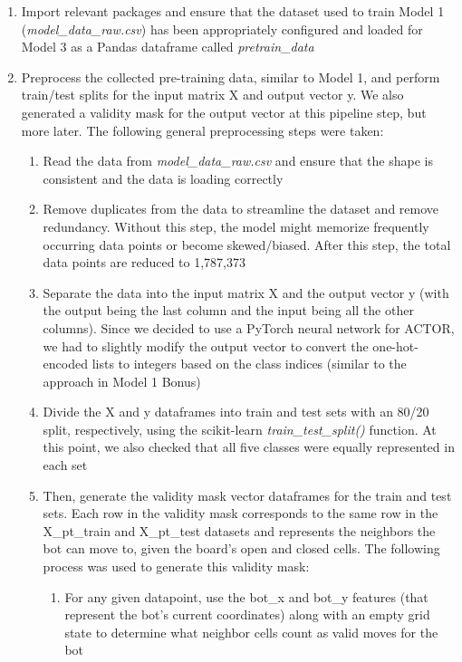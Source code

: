 \documentclass[11pt]{article}
\begin{document}
\begin{enumerate}
    \item Import relevant packages and ensure that the dataset used to train Model 1 (\emph{model\_data\_raw.csv}) has been appropriately configured and loaded for Model 3 as a Pandas dataframe called \emph{pretrain\_data}
    \item Preprocess the collected pre-training data, similar to Model 1, and perform train/test splits for the input matrix X and output vector y. We also generated a validity mask for the output vector at this pipeline step, but more later. The following general preprocessing steps were taken:
    \begin{enumerate}
        \item Read the data from \emph{model\_data\_raw.csv} and ensure that the shape is consistent and the data is loading correctly
        \item Remove duplicates from the data to streamline the dataset and remove redundancy. Without this step, the model might memorize frequently occurring data points or become skewed/biased. After this step, the total data points are reduced to 1,787,373
        \item Separate the data into the input matrix X and the output vector y (with the output being the last column and the input being all the other columns). Since we decided to use a PyTorch neural network for ACTOR, we had to slightly modify the output vector to convert the one-hot-encoded lists to integers based on the class indices (similar to the approach in Model 1 Bonus)
        \item Divide the X and y dataframes into train and test sets with an 80/20 split, respectively, using the scikit-learn \emph{train\_test\_split()} function. At this point, we also checked that all five classes were equally represented in each set
        \item Then, generate the validity mask vector dataframes for the train and test sets. Each row in the validity mask corresponds to the same row in the X\_pt\_train and X\_pt\_test datasets and represents the neighbors the bot can move to, given the board's open and closed cells. The following process was used to generate this validity mask:
        \begin{enumerate}
            \item For any given datapoint, use the bot\_x and bot\_y features (that represent the bot's current coordinates) along with an empty grid state to determine what neighbor cells count as valid moves for the bot

\end{enumerate}
\end{enumerate}
\end{enumerate}
\end{document}
